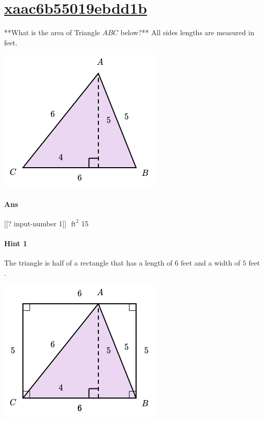 \documentclass[twocolumn,10pt]{article}
\def\shrinkfactor{0.55}
\begin{document}
\section{\href{https://www.khanacademy.org/devadmin/content/items/xaac6b55019ebdd1b}{xaac6b55019ebdd1b}}

\noindent
**What is the area of Triangle $ABC$ below?**  
All sides lengths are measured in feet.  


\includegraphics[scale=\shrinkfactor]{figures/3a90146fc5362572c5ad0fa821a46373bb67ecf8.png}

\paragraph{Ans} [[? input-number 1]] $\text { ft}^2$  15

\paragraph{Hint 1}The triangle is half of a rectangle that has a length of $6\text{ feet}$ and a width of $5\text{ feet}$.  


\includegraphics[scale=\shrinkfactor]{figures/465c4efe535b5f7bd3aed911ef0d3d9f41f810a8.png}
\end{document}
